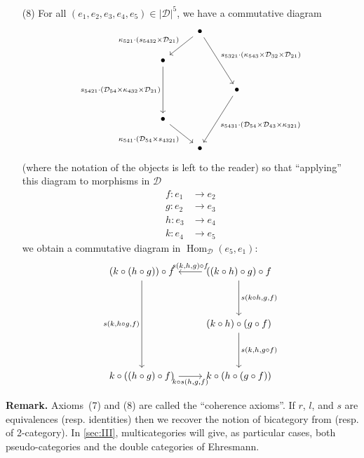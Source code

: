 \documentclass[fleqn]{article}
\newenvironment{rmenv}[1]
  {\phantomsection\par\medskip\noindent\textbf{#1.}\rmfamily}
  {\par\medskip}
\newcommand{\oldpage}[1]{\marginpar{\footnotesize$\Big\vert$ \textit{p.~#1}}}
\newcommand{\cat}[1]{\mathcal{#1}}
\newcommand{\set}[1]{|#1|}
\DeclareMathOperator{\Hom}{Hom}
\begin{document}
\begin{enumerate}
  \item[(8)]
    For all $(e_1,e_2,e_3,e_4,e_5)\in\set{\cat{D}}^5$, we have a commutative diagram
    \[
      \begin{tikzcd}
      & \bullet
          \ar[dl,swap,"\kappa_{521}\cdot(s_{5432}\times\cat{D}_{21})"]
          \ar[ddr,"s_{5321}\cdot(\kappa_{543}\times\cat{D}_{32}\times\cat{D}_{21})"]
      \\\bullet
          \ar[dd,swap,"s_{5421}\cdot(\cat{D}_{54}\times\kappa_{432}\times\cat{D}_{21})"]
      \\
      &&\bullet
          \ar[ddl,"s_{5431}\cdot(\cat{D}_{54}\times\cat{D}_{43}\times\kappa_{321})"]
      \\\bullet
          \ar[dr,swap,"\kappa_{541}\cdot(\cat{D}_{54}\times s_{4321})"]
      \\
      & \bullet
      \end{tikzcd}
    \]
    (where the notation of the objects is left to the reader) so that ``applying'' this diagram to morphisms in $\cat{D}$
    \[
      \begin{aligned}
        f\colon e_1
      & \to e_2
      \\g\colon e_2
      & \to e_3
      \\h\colon e_3
      & \to e_4
      \\k\colon e_4
      & \to e_5
      \end{aligned}
    \]
     we obtain a commutative diagram in $\Hom_\cat{D}(e_5,e_1)$:
     \[
       \begin{tikzcd}[row sep=huge]
          (k\circ(h\circ g))\circ f
            \ar[dd,swap,"{s(k,h\circ g,f)}"]
        & ((k\circ h)\circ g)\circ f
            \ar[l,swap,"{s(k,h,g)\circ f}"]
            \ar[d,"{s(k\circ h,g,f)}"]
        \\
        & (k\circ h)\circ(g\circ f)
            \ar[d,"{s(k,h,g\circ f)}"]
        \\k\circ((h\circ g)\circ f)
            \ar[r,swap,"{k\circ s(h,g,f)}"]
        & k\circ(h\circ(g\circ f))
       \end{tikzcd}
     \]
\end{enumerate}

\begin{rmenv}{Remark}
  \oldpage{246}
  Axioms~(7) and (8) are called the ``coherence axioms''.
  If $r$, $l$, and $s$ are equivalences (resp. identities) then we recover the notion of bicategory from \cite{Be} (resp. of 2-category).
  In \cref{sec:III}, multicategories will give, as particular cases, both pseudo-categories and the double categories of Ehresmann.
\end{rmenv}
\end{document}
